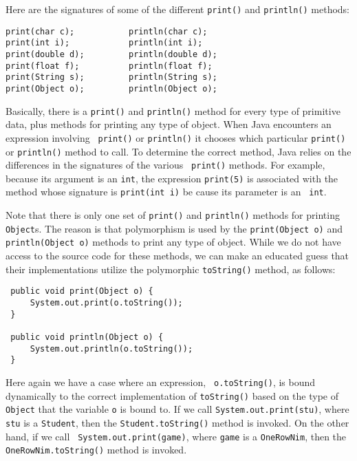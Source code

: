 Here are the signatures of some of the different {\tt print()} and
{\tt println()} methods:

\begin{jjjlisting}
\begin{lstlisting}
print(char c);           println(char c);
print(int i);            println(int i);
print(double d);         println(double d);
print(float f);          println(float f);
print(String s);         println(String s);
print(Object o);         println(Object o);
\end{lstlisting}
\end{jjjlisting}

\noindent Basically, there is a {\tt print()} and {\tt println()}
method for every type of primitive data, plus methods for printing any
type of object.  When Java encounters an expression involving {\tt
print()} or {\tt println()} it chooses which particular {\tt print()}
or {\tt println()} method to call. To determine the correct method,
Java relies on the differences in the signatures of the various {\tt
print()} methods. For example, because its argument is an {\tt int},
the expression {\tt print(5)} is associated with the method whose
signature is {\tt print(int i)} be cause its parameter is an {\tt
int}.

Note that there is only one set of {\tt print()} and {\tt println()}
methods for printing {\tt Object}s.  The reason is that polymorphism
is used by the {\tt print(Object o)} and {\tt println(Object o)}
methods to print any type of object.  While we do not have access to
the source code for these methods, we can make an educated guess that
their implementations utilize the polymorphic {\tt toString()} method,
as follows:

\begin{jjjlisting}
\begin{lstlisting}
 public void print(Object o) {
     System.out.print(o.toString());
 }
 
 public void println(Object o) {
     System.out.println(o.toString());
 }    
\end{lstlisting}
\end{jjjlisting}

\noindent Here again we have a case where an expression, {\tt
o.toString()}, is bound dynamically to the correct implementation of
{\tt toString()} based on the type of {\tt Object} that the variable
{\tt o} is bound to. If we call {\tt System.out.print(stu)}, where
{\tt stu} is a {\tt Student}, then the {\tt Student.toString()} method
is invoked. On the other hand, if we call {\tt
System.out.print(game)}, where {\tt game} is a {\tt OneRowNim}, then
the {\tt OneRowNim.toString()} method is invoked.


